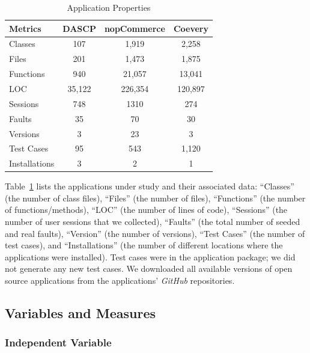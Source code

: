\begin{table}
\caption{Application Properties}
\vspace*{-10pt}
\begin{center}
\begin{tabular}{|l|c|c|c|} \hline
\textbf{Metrics}  & \textbf{DASCP} & \textbf{nopCommerce} 
& \textbf{Coevery} \\\hline \hline
Classes   & 107  & 1,919& 2,258 \\\hline
Files  & 201  & 1,473 & 1,875 \\\hline
Functions & 940  & 21,057 & 13,041 \\\hline
LOC & 35,122 & 226,354 &120,897 \\\hline
Sessions  & 748 & 1310 & 274 \\\hline
Faults  & 35 & 70 & 30\\\hline
Versions  & 3 & 23 & 3 \\\hline
Test Cases & 95& 543 & 1,120 \\\hline
Installations & 3 & 2 & 1 \\\hline
\end{tabular}
\end {center}
\vspace*{-15pt}
\label{tab:AUTs}
\end{table}

Table~\ref{tab:AUTs} lists the applications under study and
their associated data: ``Classes'' (the number of class files), 
``Files'' (the number of files), ``Functions'' (the number of 
functions/methods), ``LOC'' (the number of lines of code), 
``Sessions'' (the number of user sessions that we collected), 
``Faults'' (the total number of seeded and real faults), ``Version'' (the number 
of versions), ``Test Cases'' (the number of test cases), and
``Installations'' (the number of different locations where the 
applications were installed). 
Test cases were in the application package; we did not generate any 
new test cases. We downloaded all available versions of open source applications 
from the applications' \textit{GitHub} repositories. 

\subsection{Variables and Measures}
\label{sec:measures}

\subsubsection{Independent Variable}

